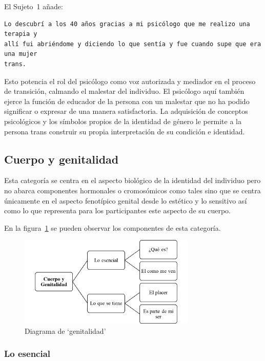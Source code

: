 El Sujeto~1 añade:

\begin{verbatim}
Lo descubrí a los 40 años gracias a mi psicólogo que me realizo una terapia y
allí fui abriéndome y diciendo lo que sentía y fue cuando supe que era una mujer
trans.
\end{verbatim}

Esto potencia el rol del psicólogo como voz autorizada y mediador en el proceso
de transición, calmando el malestar del individuo. El psicólogo aquí también
ejerce la función de educador de la persona con un malestar que no ha podido
significar o expresar de una manera satisfactoria. La adquisición de conceptos
psicológicos y los símbolos propios de la identidad de género le permite a la
persona trans construir su propia interpretación de su condición e identidad.

\subsection{Cuerpo y genitalidad}

Esta categoría se centra en el aspecto biológico de la identidad del individuo
pero no abarca componentes hormonales o cromosómicos como tales sino que se
centra únicamente en el aspecto fenotípico genital desde lo estético y lo
sensitivo así como lo que representa para los participantes este aspecto de su
cuerpo.

En la figura~\ref{fig:genitalidad} se pueden observar los componentes de esta
categoría.

\begin{figure}
    \centering
    \includegraphics[width=0.75\textwidth]{genitalidad}
    \caption{Diagrama de ‘genitalidad’}\label{fig:genitalidad}
\end{figure}

\subsubsection{Lo esencial}

